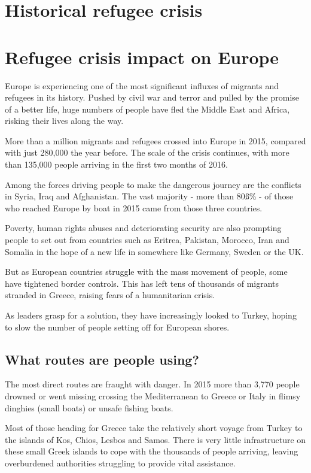\section{Historical refugee crisis}

\section{Refugee crisis impact on Europe}

Europe is experiencing one of the most significant influxes of migrants and refugees in its history. Pushed by civil war and terror and pulled by the promise of a better life, huge numbers of people have fled the Middle East and Africa, risking their lives along the way.

More than a million migrants and refugees crossed into Europe in 2015, compared with just 280,000 the year before. The scale of the crisis continues, with more than 135,000 people arriving in the first two months of 2016.

Among the forces driving people to make the dangerous journey are the conflicts in Syria, Iraq and Afghanistan. The vast majority - more than 80ß\% - of those who reached Europe by boat in 2015 came from those three countries.

Poverty, human rights abuses and deteriorating security are also prompting people to set out from countries such as Eritrea, Pakistan, Morocco, Iran and Somalia in the hope of a new life in somewhere like Germany, Sweden or the UK.

But as European countries struggle with the mass movement of people, some have tightened border controls. This has left tens of thousands of migrants stranded in Greece, raising fears of a humanitarian crisis.

As leaders grasp for a solution, they have increasingly looked to Turkey, hoping to slow the number of people setting off for European shores.

\subsection{What routes are people using?} 

The most direct routes are fraught with danger. In 2015 more than 3,770 people drowned or went missing crossing the Mediterranean to Greece or Italy in flimsy dinghies (small boats) or unsafe fishing boats.

Most of those heading for Greece take the relatively short voyage from Turkey to the islands of Kos, Chios, Lesbos and Samos. There is very little infrastructure on these small Greek islands to cope with the thousands of people arriving, leaving overburdened authorities struggling to provide vital assistance.

